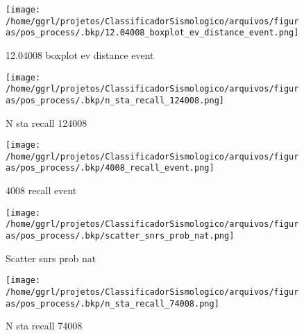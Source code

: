                     \begin{figure}[H]
                        \centering
                        \texttt{[image: /home/ggrl/projetos/ClassificadorSismologico/arquivos/figuras/pos\_process/.bkp/12.04008\_boxplot\_ev\_distance\_event.png]}
                        \caption{12.04008 boxplot ev distance event}
                        \label{fig:12.04008_boxplot_ev_distance_event}
                    \end{figure}
                

                    \begin{figure}[H]
                        \centering
                        \texttt{[image: /home/ggrl/projetos/ClassificadorSismologico/arquivos/figuras/pos\_process/.bkp/n\_sta\_recall\_124008.png]}
                        \caption{N sta recall 124008}
                        \label{fig:n_sta_recall_124008}
                    \end{figure}
                

                    \begin{figure}[H]
                        \centering
                        \texttt{[image: /home/ggrl/projetos/ClassificadorSismologico/arquivos/figuras/pos\_process/.bkp/4008\_recall\_event.png]}
                        \caption{4008 recall event}
                        \label{fig:4008_recall_event}
                    \end{figure}
                

                    \begin{figure}[H]
                        \centering
                        \texttt{[image: /home/ggrl/projetos/ClassificadorSismologico/arquivos/figuras/pos\_process/.bkp/scatter\_snrs\_prob\_nat.png]}
                        \caption{Scatter snrs prob nat}
                        \label{fig:scatter_snrs_prob_nat}
                    \end{figure}
                

                    \begin{figure}[H]
                        \centering
                        \texttt{[image: /home/ggrl/projetos/ClassificadorSismologico/arquivos/figuras/pos\_process/.bkp/n\_sta\_recall\_74008.png]}
                        \caption{N sta recall 74008}
                        \label{fig:n_sta_recall_74008}
                    \end{figure}
                

